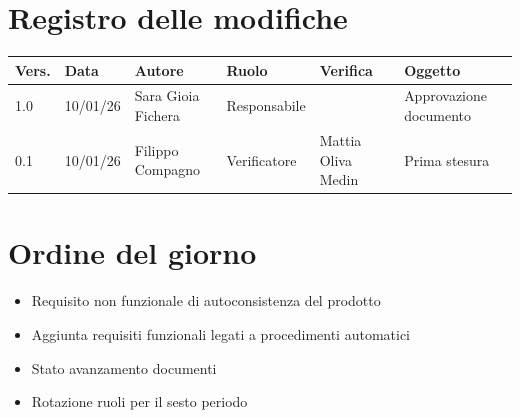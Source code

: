 \documentclass[a4paper,12pt]{article}
\begin{document}


\newpage
\section*{Registro delle modifiche}
\begin{tabularx}{\textwidth}{|l|l|l|l|X|X|}
\hline
\textbf{Vers.} & \textbf{Data} & \textbf{Autore} & \textbf{Ruolo} & \textbf{Verifica} & \textbf{Oggetto} \\
\hline
1.0 & 10/01/26 & Sara Gioia Fichera & Responsabile & & Approvazione documento \\
\hline
0.1 & 10/01/26 & Filippo Compagno & Verificatore & Mattia Oliva Medin & Prima stesura \\
\hline
\end{tabularx}

\newpage
\tableofcontents

\newpage
\section{Ordine del giorno}
\begin{itemize}
    \item Requisito non funzionale di autoconsistenza del prodotto
    \item Aggiunta requisiti funzionali legati a procedimenti automatici
    \item Stato avanzamento documenti
    \item Rotazione ruoli per il sesto periodo
\end{itemize}

\newpage
\end{document}
